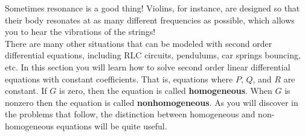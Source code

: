 Sometimes resonance is a good thing!  Violins, for instance, are designed so that their body resonates at as many different frequencies as possible, which allows you to hear the vibrations of the strings! \\

There are many other situations that can be modeled with second order differential equations, including RLC circuits, pendulums, car springs bouncing, etc. In this section you will learn how to solve second order linear differential equations with constant coefficients. That is, equations where $P$, $Q$, and $R$ are constant. If $G$ is zero, then the equation is called \textbf{homogeneous}. When $G$ is nonzero then the equation is called \textbf{nonhomogeneous}. As you will discover in the problems that follow, the distinction between homogeneous and non-homogeneous equations will be quite useful.

\clearpage


